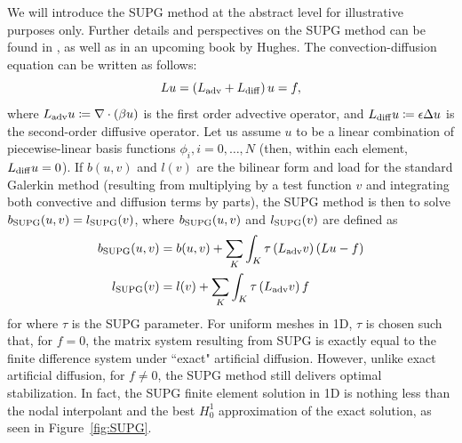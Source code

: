 We will introduce the SUPG method at the abstract level for illustrative purposes only.  Further details and perspectives on the SUPG method can be found in \cite{SUPG}, as well as in an upcoming book by Hughes.  The convection-diffusion equation can be written as follows:
\[
Lu = \left(L_{\rm adv} + L_{\rm diff} \right) u = f,
\]
where $L_{\rm adv}u \coloneqq \div \left(\beta u\right)$ is the first order advective operator, and $L_{\rm diff}u \coloneqq \epsilon \Delta u$ is the second-order diffusive operator.  Let us assume $u$ to be a linear combination of piecewise-linear basis functions $\phi_i, i = 0,\ldots,N$ (then, within each element, $L_{\rm diff} u = 0$).  If $b(u,v)$ and $l(v)$ are the bilinear form and load for the standard Galerkin method (resulting from multiplying by a test function $v$ and integrating both convective and diffusion terms by parts), the SUPG method is then to solve $b_{\rm SUPG}(u,v) = l_{\rm SUPG}(v)$, where $b_{\rm SUPG}(u,v)$ and $l_{\rm SUPG}(v)$ are defined as
\begin{align*}
b_{\rm SUPG}(u,v) &= b(u,v)+ \sum_{K} \int_{K} \tau \LRp{L_{\rm adv} v} \LRp{L u - f} \\
l_{\rm SUPG}(v) &= l(v) + \sum_{K} \int_{K} \tau \LRp{L_{\rm adv}v} f
\end{align*}
for where $\tau$ is the SUPG parameter. For uniform meshes in 1D, $\tau$ is chosen such that, for $f=0$, the matrix system resulting from SUPG is exactly equal to the finite difference system under ``exact" artificial diffusion.  However, unlike exact artificial diffusion, for $f\neq 0$, the SUPG method still delivers optimal stabilization.  In fact, the SUPG finite element solution in 1D is nothing less than the nodal interpolant and the best $H^1_0$ approximation of the exact solution, as seen in Figure~\ref{fig:SUPG}.

